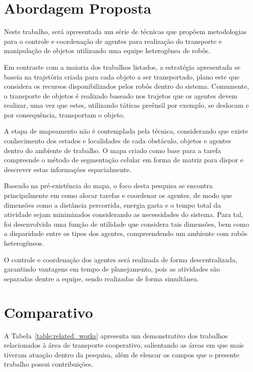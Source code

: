 \section{Abordagem Proposta} %
\label{sec:abordagem_proposta}

Neste trabalho, será apresentada um série de técnicas que propõem metodologias para o controle e coordenação de agentes para realização do transporte e manipulação de objetos utilizando uma equipe heterogênea de robôs.

Em contraste com a maioria dos trabalhos listados, a estratégia apresentada se baseia na trajetória criada para cada objeto a ser transportado, plano este que considera os recursos disponibilizados pelos robôs dentro do sistema.
Comumente, o transporte de objetos é realizado baseado nos trajetos que os agentes devem realizar, uma vez que estes, utilizando táticas preênsil por exemplo, se deslocam e por consequência, transportam o objeto.

A etapa de mapeamento não é contemplada pela técnica, considerando que existe conhecimento dos estados e localidades de cada obstáculo, objetos e agentes dentro do ambiente de trabalho.
O mapa criado como base para a tarefa compreende o método de segmentação celular em forma de matriz para dispor e descrever estas informações espacialmente.

Baseado na pré-existência do mapa, o foco desta pesquisa se encontra principalmente em como alocar tarefas e coordenar os agentes, de modo que dimensões como a distância percorrida, energia gasta e o tempo total da atividade sejam minimizados considerando as necessidades do sistema.
Para tal, foi desenvolvida uma função de utilidade que considera tais dimensões, bem como a disparidade entre os tipos dos agentes, compreendendo um ambiente com robôs heterogêneos.

O controle e coordenação dos agentes será realizada de forma descentralizada, garantindo vantagens em tempo de planejamento, pois as atividades são separadas dentre a equipe, sendo realizadas de forma simultânea.

\section{Comparativo} %
\label{sec:comparativo}

A Tabela~\ref{table:related_works} apresenta um demonstrativo dos trabalhos relacionados à área de transporte cooperativo, salientando as áreas em que mais tiveram atuação dentro da pesquisa, além de elencar os campos que o presente trabalho possui contribuições.

